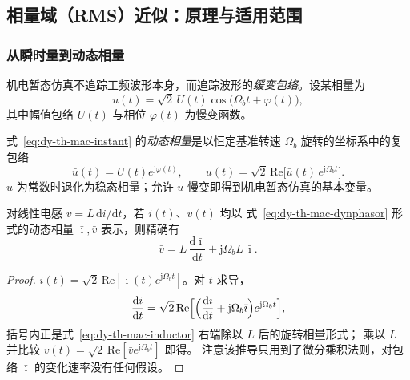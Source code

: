 \subsection{相量域（RMS）近似：原理与适用范围}\label{sec:dy-th-mac-phasor}

\subsubsection{从瞬时量到动态相量}

机电暂态仿真不追踪工频波形本身，而追踪波形的\emph{缓变包络}。设某相量为
\begin{equation}
u(t)=\sqrt2\,U(t)\cos\bigl(\Omega_b t+\varphi(t)\bigr),
\label{eq:dy-th-mac-instant}
\end{equation}
其中幅值包络 $U(t)$ 与相位 $\varphi(t)$ 为慢变函数。

\begin{definition}[动态相量]\label{def:dy-th-mac-phasor}
式~\eqref{eq:dy-th-mac-instant} 的\emph{动态相量}是以恒定基准转速 $\Omega_b$
旋转的坐标系中的复包络
\begin{equation}
\bar u(t)=U(t)e^{\mathrm j\varphi(t)},\qquad
u(t)=\sqrt2\,\mathrm{Re}\bigl[\bar u(t)\,e^{\mathrm j\Omega_b t}\bigr].
\label{eq:dy-th-mac-dynphasor}
\end{equation}
$\bar u$ 为常数时退化为稳态相量；允许 $\bar u$ 慢变即得到机电暂态仿真的基本变量。
\end{definition}

\begin{proposition}[电感支路的动态相量方程]\label{prop:dy-th-mac-inductor}
对线性电感 $v=L\,\mathrm di/\mathrm dt$，若 $i(t)$、$v(t)$ 均以
式~\eqref{eq:dy-th-mac-dynphasor} 形式的动态相量 $\bar\imath,\bar v$ 表示，则精确有
\begin{equation}
\bar v=L\,\frac{\mathrm d\bar\imath}{\mathrm dt}+\mathrm j\Omega_b L\,\bar\imath .
\label{eq:dy-th-mac-inductor}
\end{equation}
\end{proposition}

\begin{proof}
$i(t)=\sqrt2\,\mathrm{Re}[\bar\imath(t)e^{\mathrm j\Omega_b t}]$。对 $t$ 求导，
\begin{equation}
\frac{\mathrm di}{\mathrm dt}
=\sqrt2\,\mathrm{Re}\Bigl[\Bigl(\frac{\mathrm d\bar\imath}{\mathrm dt}
+\mathrm j\Omega_b\bar\imath\Bigr)e^{\mathrm j\Omega_b t}\Bigr],
\end{equation}
括号内正是式~\eqref{eq:dy-th-mac-inductor} 右端除以 $L$ 后的旋转相量形式；
乘以 $L$ 并比较 $v(t)=\sqrt2\,\mathrm{Re}[\bar v e^{\mathrm j\Omega_b t}]$ 即得。
注意该推导只用到了微分乘积法则，对包络 $\bar\imath$ 的变化速率没有任何假设。
\end{proof}

